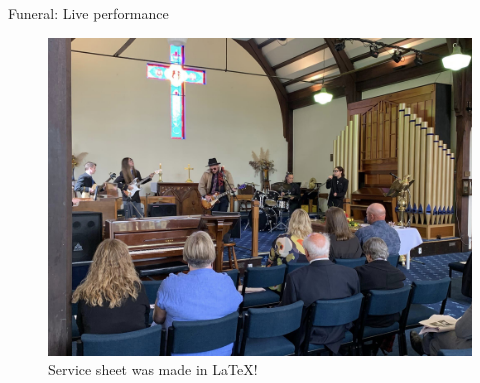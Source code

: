 \documentclass{beamer}
\begin{document}
\begin{frame}{Funeral: Live performance}

\begin{figure}
    \centering
    \includegraphics[width=\linewidth]{assets/wont_get_fooled_again.jpg}
    \caption{Service sheet was made in \LaTeX!}
    \label{fig:qr-code}
\end{figure}
\end{frame}
\end{document}
